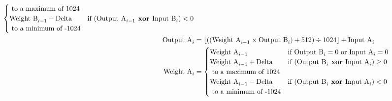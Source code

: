 \begin{align*}
\begin{cases}
\text{ to a maximum of 1024} \\
\text{Weight B}_{i - 1} - \text{Delta} & \text{if } (\text{Output A}_{i - 1} \textbf{ xor } \text{Input B}_i) < 0 \\
\text{ to a minimum of -1024}
\end{cases} \\
\text{Output A}_i &= \lfloor ((\text{Weight A}_{i - 1} \times \text{Output B}_i) + 512) \div 1024 \rfloor + \text{Input A}_i \\
\text{Weight A}_i &=
\begin{cases}
\text{Weight A}_{i - 1} & \text{if } \text{Output B}_i = 0 \text{ or } \text{Input A}_i = 0 \\
\text{Weight A}_{i - 1} + \text{Delta} & \text{if } (\text{Output B}_i \textbf{ xor } \text{Input A}_i) \geq 0 \\
\text{ to a maximum of 1024} \\
\text{Weight A}_{i - 1} - \text{Delta} & \text{if } (\text{Output B}_i \textbf{ xor } \text{Input A}_i) < 0 \\
\text{ to a minimum of -1024}
\end{cases}
\end{align*}
